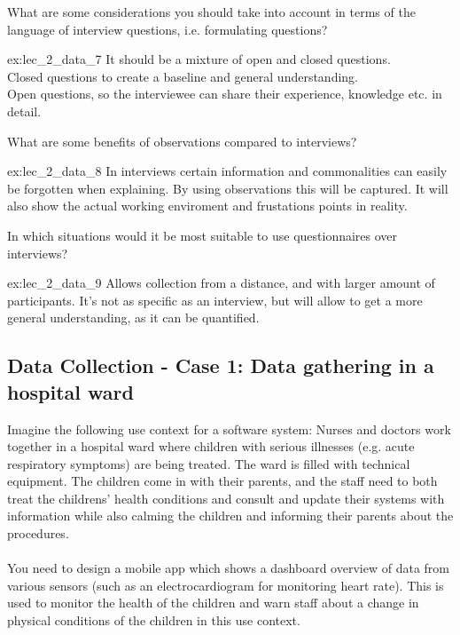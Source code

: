 \begin{exercise}{\parbox{\linewidth*3/4}{What are some considerations you should take into account in terms of the language of interview questions, i.e. formulating questions?}}{ex:lec_2_data_7}
    It should be a mixture of open and closed questions.\\
    Closed questions to create a baseline and general understanding.\\
    Open questions, so the interviewee can share their experience, knowledge etc. in detail. 
\end{exercise}

\begin{exercise}{\parbox{\linewidth*3/4}{What are some benefits of observations compared to interviews?}}{ex:lec_2_data_8}
    In interviews certain information and commonalities can easily be forgotten when explaining. By using observations this will be captured. It will also show the actual working enviroment and frustations points in reality.
\end{exercise}

\begin{exercise}{\parbox{\linewidth*3/4}{In which situations would it be most suitable to use questionnaires over interviews? }}{ex:lec_2_data_9}
    Allows collection from a distance, and with larger amount of participants. It's not as specific as an interview, but will allow to get a more general understanding, as it can be quantified.
\end{exercise}
\clearpage
\subsection{Data Collection - Case 1: Data gathering in a hospital ward}
Imagine the following use context for a software system: Nurses and doctors work together in a hospital ward where children with serious illnesses (e.g. acute respiratory symptoms) are being treated. The ward is filled with technical equipment. The children come in with their parents, and the staff need to both treat the childrens’ health conditions and consult and update their systems with information while also calming the children and informing their parents about the procedures.
\\\\
You need to design a mobile app which shows a dashboard overview of data from various sensors (such as an electrocardiogram for monitoring heart rate). This is used to monitor the health of the children and warn staff about a change in physical conditions of the children in this use context. 

